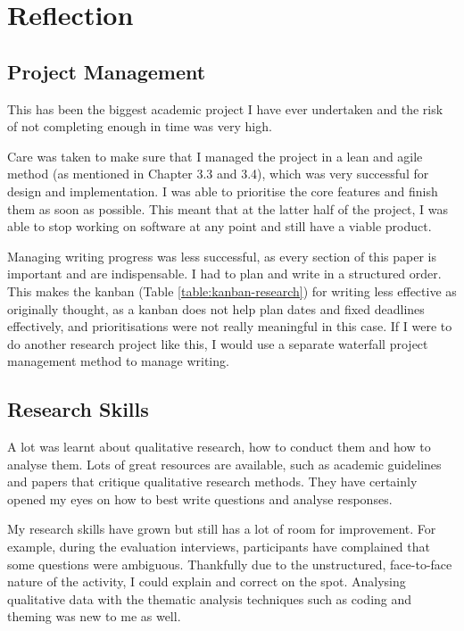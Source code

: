 \chapter{Reflection} 

\section{Project Management}

This has been the biggest academic project I have ever undertaken and 
the risk of not completing enough in time was very high.

Care was taken to make sure that I managed the project in a lean and agile method (as mentioned in Chapter 3.3 and 3.4), 
which was very successful for design and implementation. 
I was able to prioritise the core features and finish them as soon as possible. 
This meant that at the latter half of the project, I was able to stop working on software at any point and still have a viable product.

Managing writing progress was less successful, as every section of this paper is important and are indispensable. 
I had to plan and write in a structured order. This makes the kanban (Table \ref{table:kanban-research}) for writing 
less effective as originally thought, as a kanban does not help plan dates and fixed deadlines effectively, 
and prioritisations were not really meaningful in this case. 
If I were to do another research project like this, I would use a separate waterfall project management method to manage writing.

\section{Research Skills}

A lot was learnt about qualitative research, how to conduct them and how to analyse them.
Lots of great resources are available, such as academic guidelines and papers that critique qualitative research methods.
They have certainly opened my eyes on how to best write questions and analyse responses.

My research skills have grown but still has a lot of room for improvement. 
For example, during the evaluation interviews, participants have complained that some questions were ambiguous. 
Thankfully due to the unstructured, face-to-face nature of the activity, I could explain and correct on the spot.
Analysing qualitative data with the thematic analysis techniques such as coding and theming \citep{clarke2014thematic} 
was new to me as well.


